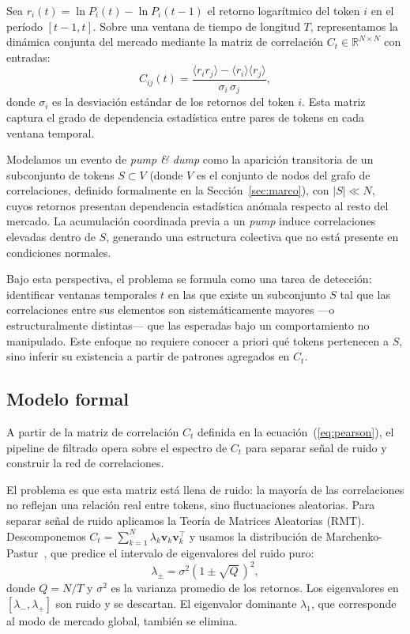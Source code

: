

\iffalse
Sea $r_i(t) = \ln P_i(t) - \ln P_i(t-1)$ el retorno logarítmico del token $i$
en el período $[t-1, t]$. Sobre una ventana de tiempo de longitud $T$,
representamos la dinámica conjunta del mercado mediante la matriz de correlación
$C_t \in \mathbb{R}^{N \times N}$ con entradas:
\begin{equation}
  C_{ij}(t) = \frac{\langle r_i r_j \rangle - \langle r_i \rangle\langle r_j \rangle}
  {\sigma_i \,\sigma_j},
  \label{eq:pearson}
\end{equation}
donde $\sigma_i$ es la desviación estándar de los retornos del token $i$. Esta
matriz captura el grado de dependencia estadística entre pares de tokens en
cada ventana temporal.

Modelamos un evento de \emph{pump \& dump} como la aparición transitoria de un
subconjunto de tokens $S \subset V$ (donde $V$ es el conjunto de nodos del
grafo de correlaciones, definido formalmente en la Sección~\ref{sec:marco}),
con $|S| \ll N$, cuyos retornos presentan
dependencia estadística anómala respecto al resto del mercado. La acumulación
coordinada previa a un \emph{pump} induce correlaciones elevadas dentro de $S$,
generando una estructura colectiva que no está presente en condiciones normales.

Bajo esta perspectiva, el problema se formula como una tarea de detección:
identificar ventanas temporales $t$ en las que existe un subconjunto $S$ tal
que las correlaciones entre sus elementos son sistemáticamente mayores ---o
estructuralmente distintas--- que las esperadas bajo un comportamiento no
manipulado. Este enfoque no requiere conocer a priori qué tokens pertenecen a
$S$, sino inferir su existencia a partir de patrones agregados en $C_t$.

\subsection{Modelo formal}
\label{sec:modelo}

A partir de la matriz de correlación $C_t$ definida en la
ecuación~(\ref{eq:pearson}), el pipeline de filtrado opera sobre el espectro de
$C_t$ para separar señal de ruido y construir la red de correlaciones.

El problema es que esta matriz está llena de ruido: la mayoría de las
correlaciones no reflejan una relación real entre tokens, sino fluctuaciones
aleatorias. Para separar señal de ruido aplicamos la Teoría de Matrices
Aleatorias (RMT). Descomponemos $C_t = \sum_{k=1}^{N} \lambda_k
\mathbf{v}_k \mathbf{v}_k^\top$ y usamos la distribución de
Marchenko-Pastur~\cite{plerou1999}, que predice el intervalo de eigenvalores
del ruido puro:
\begin{equation}
  \lambda_{\pm} = \sigma^2\!\left(1 \pm \sqrt{Q}\,\right)^{\!2},
  \label{eq:mp}
\end{equation}
donde $Q = N/T$ y $\sigma^2$ es la varianza promedio de los retornos.
Los eigenvalores en $[\lambda_-, \lambda_+]$ son ruido y se descartan.
El eigenvalor dominante $\lambda_1$, que corresponde al modo de mercado
global, también se elimina.

